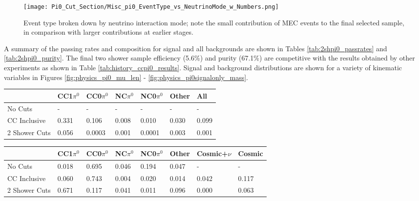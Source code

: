 \begin{figure}[H]
\centering
\texttt{[image: Pi0\_Cut\_Section/Misc\_pi0\_EventType\_vs\_NeutrinoMode\_w\_Numbers.png]}
\caption{ Event type broken down by neutrino interaction mode; note the small contribution of MEC events to the final selected sample, in comparison with larger contributions at earlier stages. }
\label{fig:physics_2shower_inttype}
\end{figure}

\par A summary of the passing rates and composition for signal and all backgrounds are shown in Tables \ref{tab:2shpi0_passrates} and \ref{tab:2shpi0_purity}. The final two shower sample efficiency (5.6\%) and purity (67.1\%) are competitive with the results obtained by other experiments as shown in Table \ref{tab:history_ccpi0_results}. Signal and background distributions are shown for a variety of kinematic variables in Figures \ref{fig:physics_pi0_mu_len} - \ref{fig:physics_pi0signalonly_mass}. 

\begin{table}[H]
\centering
{}
 \begin{tabular}{| l | l | l |l|l|l|l|}
 \hline
 & CC1$\pi^0$ & CC0$\pi^0$ & NC$\pi^0$ & NC0$\pi^0$ & Other & All \\ [0.1ex] \hline
No Cuts & - & - & - & - & - & -\\
CC Inclusive & 0.331 & 0.106 & 0.008 & 0.010 & 0.030 & 0.099 \\ 
2 Shower Cuts & 0.056 & 0.0003 & 0.001 & 0.0001 & 0.003 & 0.001 \\ \hline
\end{tabular}
\end{table}

\begin{table}[H]
\centering
{}
 \begin{tabular}{| l | l | l |l|l|l|l|l|}
 \hline
  & CC1$\pi^0$ & CC0$\pi^0$ & NC$\pi^0$ & NC0$\pi^0$ & Other& Cosmic+$\nu$& Cosmic \\ [0.1ex] \hline
No Cuts  & 0.018 &  0.695 & 0.046 & 0.194  & 0.047 & -&-\\
CC Inclusive & 0.060 & 0.743 & 0.004 & 0.020 & 0.014 & 0.042 & 0.117  \\ 
2 Shower Cuts  & 0.671 & 0.117 & 0.041 & 0.011 & 0.096 & 0.000 & 0.063 \\ \hline
\end{tabular}
\end{table}

